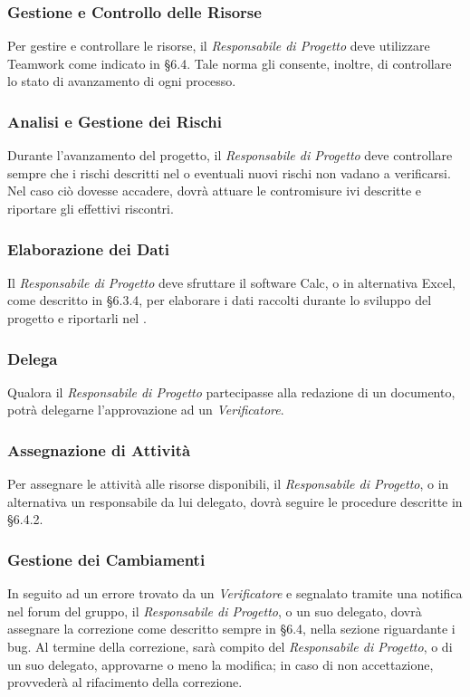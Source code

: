 \subsubsection{Gestione e Controllo delle Risorse}
Per gestire e controllare le risorse, il \textit{Responsabile di Progetto} deve utilizzare Teamwork come indicato in §6.4. Tale norma gli consente, inoltre, di controllare lo stato di avanzamento di ogni processo.

\subsubsection{Analisi e Gestione dei Rischi}
Durante l'avanzamento del progetto, il \textit{Responsabile di Progetto} deve controllare sempre che i rischi descritti nel \PianoDiProgetto{} o eventuali nuovi rischi non vadano a verificarsi. Nel caso ciò dovesse accadere, dovrà attuare le contromisure ivi descritte e riportare gli effettivi riscontri.

\subsubsection{Elaborazione dei Dati}
Il \textit{Responsabile di Progetto} deve sfruttare il software Calc, o in alternativa Excel, come descritto in §6.3.4, per elaborare i dati raccolti durante lo sviluppo del progetto e riportarli nel \PianoDiProgetto{}.

\subsubsection{Delega}
Qualora il \textit{Responsabile di Progetto} partecipasse alla redazione di un documento, potrà delegarne l'approvazione ad un \textit{Verificatore}.

\subsubsection{Assegnazione di Attività}
Per assegnare le attività alle risorse disponibili, il \textit{Responsabile di Progetto}, o in alternativa un responsabile da lui delegato, dovrà seguire le procedure descritte in §6.4.2.

\subsubsection{Gestione dei Cambiamenti}
In seguito ad un errore trovato da un \textit{Verificatore} e segnalato tramite una notifica nel forum del gruppo, il \textit{Responsabile di Progetto}, o un suo delegato, dovrà assegnare la correzione come descritto sempre in §6.4, nella sezione riguardante i bug. Al termine della correzione, sarà compito del \textit{Responsabile di Progetto}, o di un suo delegato, approvarne o meno la modifica; in caso di non accettazione, provvederà al rifacimento della correzione.


